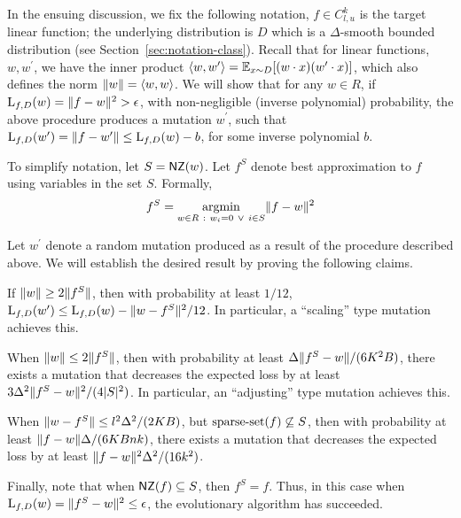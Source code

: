 In the ensuing discussion, we fix the following notation, $f \in C^k_{l, u}$ is
the target linear function; the underlying distribution is $D$ which is a
$\Delta$-smooth bounded distribution (see Section~\ref{sec:notation-class}). Recall
that for linear functions, $w, w^\prime$, we have the inner product
$\langle w, w^\prime \rangle = \mathbb{E}_{x \sim D}[(w \cdot x) (w^\prime \cdot x)]$, which also
defines the norm $\Vert w \Vert = \langle w, w \rangle$.  We will show that for any $w \in
R$, if $\mathrm{L}_{f, D}(w) = \Vert f - w \Vert^2 > \epsilon$, with non-negligible
(inverse polynomial) probability, the above procedure produces a mutation
$w^\prime$, such that $\mathrm{L}_{f, D}(w^\prime) = \Vert f - w^\prime \Vert \leq
\mathrm{L}_{f, D}(w) - b$, for some inverse polynomial $b$.

To simplify notation, let $S = \mathsf{NZ}(w)$. Let $f^S$ denote best approximation to
$f$ using variables in the set $S$. Formally, 
%
\[ 
f^S = \underset{w \in R ~:~ w_i = 0 ~\vee~ i \in S} {\mathrm{argmin}} \Vert f- w \Vert^2 
\]

Let $w^\prime$ denote a random mutation produced as a result of the procedure
described above.  We will establish the desired result by proving the following
claims.
\begin{claim} \label{claim:apple} If $\Vert w \Vert \geq 2 \Vert f^S \Vert$, then
with probability at least $1/12$, $\mathrm{L}_{f, D}(w^\prime) \leq \mathrm{L}_{f, D}(w) -
\Vert w - f^S \Vert^2/12$. In particular, a ``scaling'' type mutation achieves
this. \end{claim}
\begin{claim} \label{claim:banana} When $\Vert w \Vert \leq 2 \Vert f^S \Vert$,
then with probability at least $\Delta \Vert f^S - w \Vert/(6K^2 B)$, there
exists a mutation that decreases the expected loss by at least $3
\Delta^2\Vert f^S - w \Vert^2/(4|S|^2)$. In particular, an ``adjusting'' type
mutation achieves this. \end{claim}
\begin{claim} \label{claim:cantaloupe} When $\Vert w - f^S \Vert \leq
l^2\Delta^2/(2KB)$, but $\mathrm{sparse\mbox{-}set}(f) \not\subseteq S$, then with probability
at least $\Vert f - w \Vert \Delta/(6KBnk)$, there exists a mutation that
decreases the expected loss by at least $\Vert f-w \Vert^2 \Delta^2/(16k^2)$.
\end{claim}

Finally, note that when $\mathsf{NZ}(f) \subseteq S$, then $f^S = f$. Thus, in this case
when $\mathrm{L}_{f, D}(w) = \Vert f^S - w \Vert^2 \leq \epsilon$, the evolutionary
algorithm has succeeded. \medskip 

